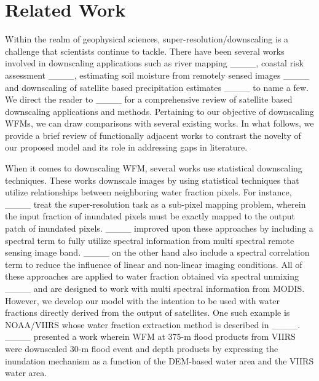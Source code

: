\section{Related Work}
\label{sec:RelatedWork}

Within the realm of geophysical sciences, super-resolution/downscaling is a challenge that scientists continue to tackle. There have been several works involved in downscaling applications such as river mapping ____, coastal risk assessment ____, estimating soil moisture from remotely sensed images ____ and downscaling of satellite based precipitation estimates ____ to name a few. We direct the reader to ____ for a comprehensive review of satellite based downscaling applications and methods. Pertaining to our objective of downscaling \acp{WFM}, we can draw comparisons with several existing works. 
In what follows, we provide a brief review of functionally adjacent works to contrast the novelty of our proposed model and its role in addressing gaps in literature. 

When it comes to downscaling \ac{WFM}, several works use statistical downscaling techniques. These works downscale images by using statistical techniques that utilize relationships between neighboring water fraction pixels. For instance, ____ treat the super-resolution task as a sub-pixel mapping problem, wherein the input fraction of inundated pixels must be exactly mapped to the output patch of inundated pixels. 
____ improved upon these approaches by including a spectral term to fully utilize spectral information from multi spectral remote sensing image band. ____ on the other hand also include a spectral correlation term to reduce the influence of linear and non-linear imaging conditions. All of these approaches are applied to water fraction obtained via spectral unmixing ____ and are designed to work with multi spectral information from MODIS. However, we develop our model with the intention to be used with water fractions directly derived from the output of satellites. One such example is NOAA/VIIRS whose water fraction extraction method is described in ____. ____ presented a work wherein \ac{WFM} at 375-m flood products from VIIRS were downscaled 30-m flood event and depth products by expressing the inundation mechanism as a function of the \ac{DEM}-based water area and the VIIRS water area.

